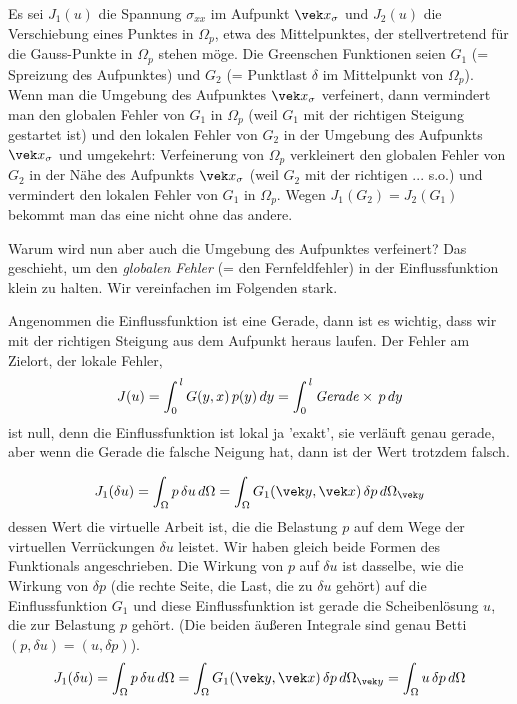 {{{Es sei $J_1(u)$ die Spannung $\sigma_{xx}$ im Aufpunkt $\vek x_{\sigma}$ und $J_2(u)$ die Verschiebung eines Punktes  in $\Omega_p$, etwa des Mittelpunktes, der stellvertretend f\"{u}r die Gauss-Punkte in $\Omega_p$ stehen m\"{o}ge. Die Greenschen Funktionen seien $G_1$ (= Spreizung des Aufpunktes) und $G_2$ (= Punktlast $\delta$ im Mittelpunkt von $\Omega_p$). Wenn man die Umgebung des Aufpunktes $\vek x_{\sigma}$ verfeinert, dann vermindert man den globalen Fehler von $G_1$ in $\Omega_p$ (weil $G_1$ mit der richtigen Steigung gestartet ist) und den lokalen Fehler von $G_2$ in der Umgebung des Aufpunkts $\vek x_{\sigma}$ und umgekehrt: Verfeinerung von $\Omega_p$ verkleinert den globalen Fehler von $G_2$ in der N\"{a}he des Aufpunkts $\vek x_{\sigma}$ (weil $G_2$ mit der richtigen ... s.o.) und vermindert den lokalen Fehler von $G_1$ in $\Omega_p$. Wegen $J_1(G_2) = J_2(G_1)$ bekommt man das eine nicht ohne das andere.

Warum wird nun aber auch die Umgebung des Aufpunktes verfeinert? Das geschieht, um den {\em globalen Fehler\/} (= den Fernfeldfehler) in der Einflussfunktion klein zu halten. Wir vereinfachen im Folgenden stark.

Angenommen die Einflussfunktion ist eine Gerade, dann ist es wichtig, dass wir mit der richtigen Steigung aus dem Aufpunkt heraus laufen. Der Fehler am Zielort, der lokale Fehler,
\begin{align}
J(u) = \int_0^{\,l} G(y,x)\,p(y)\,dy = \int_0^{\,l} \text{{\em Gerade\/}} \times \,p\,dy
\end{align}
ist null, denn die Einflussfunktion ist lokal ja 'exakt', sie verl\"{a}uft genau gerade, aber wenn die Gerade die falsche Neigung hat, dann ist der Wert trotzdem falsch.

\begin{align}
J_1(\delta u) = \int_{\Omega} p\,\delta u\,d\Omega = \int_{\Omega} G_1(\vek y,\vek x)\,\delta p\,d\Omega_{\vek y}
\end{align}
dessen Wert die virtuelle Arbeit ist, die die Belastung $p $ auf dem Wege der virtuellen Verr\"{u}ckungen $\delta u $ leistet. Wir haben gleich beide Formen des Funktionals angeschrieben. Die Wirkung von $p$ auf $\delta u$ ist dasselbe, wie die Wirkung von $\delta p$ (die rechte Seite, die Last, die zu $\delta u$ geh\"{o}rt) auf die Einflussfunktion $G_1$ und diese Einflussfunktion ist gerade die Scheibenl\"{o}sung $u$, die zur Belastung $p$ geh\"{o}rt. (Die beiden \"{a}u{\ss}eren Integrale sind genau Betti $(p, \delta u) = (u, \delta p)$).
\begin{align}
J_1(\delta u) = \int_{\Omega} p\,\delta u\,d\Omega = \int_{\Omega} G_1(\vek y,\vek x)\,\delta p\,d\Omega_{\vek y} = \int_{\Omega} u\,\delta p\,d\Omega
\end{align}

}}}
